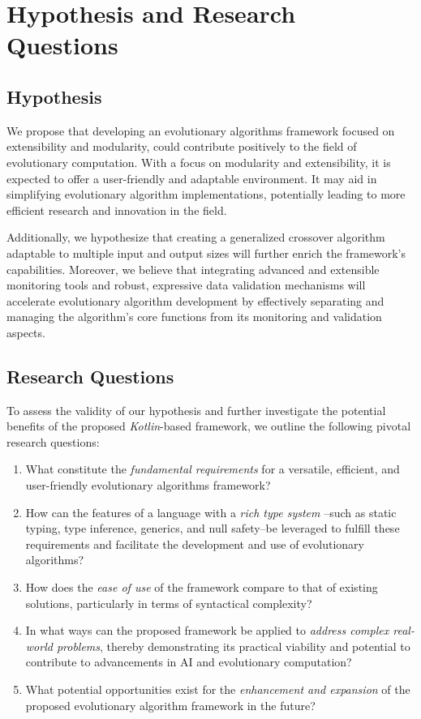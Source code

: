 \section{Hypothesis and Research Questions}
\label{sec:hyphotesis_and_research_questions}
  \subsection{Hypothesis}
    We propose that developing an evolutionary algorithms framework focused on extensibility and modularity, could 
    contribute positively to the field of evolutionary computation. With a focus on modularity and extensibility, it is 
    expected to offer a user-friendly and adaptable environment. It may aid in simplifying evolutionary algorithm 
    implementations, potentially leading to more efficient research and innovation in the field.

    Additionally, we hypothesize that creating a generalized crossover algorithm adaptable to multiple input and output 
    sizes will further enrich the framework's capabilities. Moreover, we believe that integrating advanced and 
    extensible monitoring tools and robust, expressive data validation mechanisms will accelerate evolutionary 
    algorithm development by effectively separating and managing the algorithm's core functions from its monitoring and 
    validation aspects.
    

  \subsection{Research Questions}
    To assess the validity of our hypothesis and further investigate the potential benefits of the proposed
    \textit{Kotlin}-based framework, we outline the following pivotal research questions:

    \begin{enumerate}
      \item What constitute the \textit{fundamental requirements} for a versatile, efficient, and user-friendly
        evolutionary algorithms framework?
      \item How can the features of a language with a \textit{rich type system} --such as static typing, type inference, 
        generics, and null safety--be leveraged to fulfill these requirements and facilitate the development and use of
        evolutionary algorithms?
      \item How does the \textit{ease of use} of the framework compare to that of existing solutions, particularly in
        terms of syntactical complexity?
      \item In what ways can the proposed framework be applied to \textit{address complex real-world problems}, thereby 
        demonstrating its practical viability and potential to contribute to advancements in AI and evolutionary 
        computation?
      \item What potential opportunities exist for the \textit{enhancement and expansion} of the proposed evolutionary 
        algorithm framework in the future?
    \end{enumerate}
    
